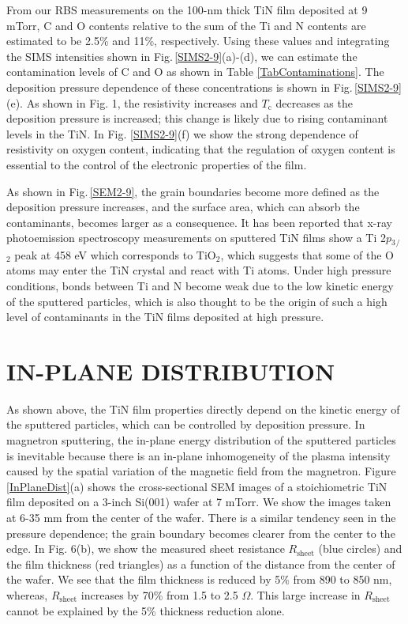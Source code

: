 From our RBS measurements on the 100-nm thick TiN film deposited at 9 mTorr, C and O contents relative to the sum of the Ti and N contents are estimated to be 2.5\% and 11\%, respectively. Using these values and integrating the SIMS intensities shown in Fig.\,\ref{SIMS2-9}(a)-(d), we can estimate the contamination levels of C and O as shown in Table \ref{TabContaminations}. The deposition pressure dependence of these concentrations is shown in Fig.\,\ref{SIMS2-9}(e). As shown in Fig. 1, the resistivity increases and $T{_\text{c}}$ decreases as the deposition pressure is increased; this change is likely due to rising contaminant levels in the TiN.  In Fig. \ref{SIMS2-9}(f) we show the strong dependence of resistivity on oxygen content, indicating that the regulation of oxygen content is essential to the control of the electronic properties of the film.

As shown in Fig.\,\ref{SEM2-9}, the grain boundaries become more defined as the deposition pressure increases, and the surface area, which can absorb the contaminants, becomes larger as a consequence. It has been reported that x-ray photoemission spectroscopy measurements on sputtered TiN films show a Ti 2$p{_3}$${_\slash}$${_2}$ peak at 458 eV which corresponds to TiO$_{2}$,\cite{Logothetidis1999} which suggests that some of the O atoms may enter the TiN crystal and react with Ti atoms. Under high pressure conditions, bonds between Ti and N become weak due to the low kinetic energy of the sputtered particles, which is also thought to be the origin of such a high level of contaminants in the TiN films deposited at high pressure.

\section{IN-PLANE DISTRIBUTION}
\label{IN-PLANE DISTRIBUTION}

As shown above, the TiN film properties directly depend on the kinetic energy of the sputtered particles, which can be controlled by deposition pressure. In magnetron sputtering, the in-plane energy distribution of the sputtered particles is inevitable because there is an in-plane inhomogeneity of the plasma intensity caused by the spatial variation of the magnetic field from the magnetron. Figure \,\ref{InPlaneDist}(a) shows the cross-sectional SEM images of a stoichiometric TiN film deposited on a 3-inch Si(001) wafer at 7 mTorr. We show the images taken at 6-35 mm from the center of the wafer. There is a similar tendency seen in the pressure dependence; the grain boundary becomes clearer from the center to the edge. In Fig. 6(b), we show the measured sheet resistance $R$$_{\text{sheet}}$ (blue circles) and the film thickness (red triangles) as a function of the distance from the center of the wafer. We see that the film thickness is reduced by 5\% from 890 to 850 nm, whereas, $R$$_{\text{sheet}}$ increases by 70\% from 1.5 to 2.5 $\Omega$. This large increase in $R$$_{\text{sheet}}$ cannot be explained by the 5\% thickness reduction alone.

